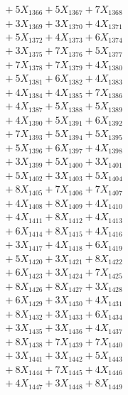 \documentclass[a4paper,10pt]{article}
\begin{document}
{\begin{align}
&\;  + 5 X_{1366} + 5 X_{1367} + 7 X_{1368} \\[0.3ex]
&\;  + 3 X_{1369} + 3 X_{1370} + 4 X_{1371} \\[0.3ex]
&\;  + 5 X_{1372} + 4 X_{1373} + 6 X_{1374} \\[0.3ex]
&\;  + 3 X_{1375} + 7 X_{1376} + 5 X_{1377} \\[0.3ex]
&\;  + 7 X_{1378} + 7 X_{1379} + 4 X_{1380} \\[0.3ex]
&\;  + 5 X_{1381} + 6 X_{1382} + 4 X_{1383} \\[0.3ex]
&\;  + 4 X_{1384} + 4 X_{1385} + 7 X_{1386} \\[0.3ex]
&\;  + 4 X_{1387} + 5 X_{1388} + 5 X_{1389} \\[0.5ex]\allowbreak
&\;  + 4 X_{1390} + 5 X_{1391} + 6 X_{1392} \\[0.3ex]
&\;  + 7 X_{1393} + 5 X_{1394} + 5 X_{1395} \\[0.3ex]
&\;  + 5 X_{1396} + 6 X_{1397} + 4 X_{1398} \\[0.3ex]
&\;  + 3 X_{1399} + 5 X_{1400} + 3 X_{1401} \\[0.3ex]
&\;  + 5 X_{1402} + 3 X_{1403} + 5 X_{1404} \\[0.3ex]
&\;  + 8 X_{1405} + 7 X_{1406} + 7 X_{1407} \\[0.3ex]
&\;  + 4 X_{1408} + 8 X_{1409} + 4 X_{1410} \\[0.3ex]
&\;  + 4 X_{1411} + 8 X_{1412} + 4 X_{1413} \\[0.3ex]
&\;  + 6 X_{1414} + 8 X_{1415} + 4 X_{1416} \\[0.3ex]
&\;  + 3 X_{1417} + 4 X_{1418} + 6 X_{1419} \\[0.5ex]\allowbreak
&\;  + 5 X_{1420} + 3 X_{1421} + 8 X_{1422} \\[0.3ex]
&\;  + 6 X_{1423} + 3 X_{1424} + 7 X_{1425} \\[0.3ex]
&\;  + 8 X_{1426} + 8 X_{1427} + 3 X_{1428} \\[0.3ex]
&\;  + 6 X_{1429} + 3 X_{1430} + 4 X_{1431} \\[0.3ex]
&\;  + 8 X_{1432} + 3 X_{1433} + 6 X_{1434} \\[0.3ex]
&\;  + 3 X_{1435} + 3 X_{1436} + 4 X_{1437} \\[0.3ex]
&\;  + 8 X_{1438} + 7 X_{1439} + 7 X_{1440} \\[0.3ex]
&\;  + 3 X_{1441} + 3 X_{1442} + 5 X_{1443} \\[0.3ex]
&\;  + 8 X_{1444} + 7 X_{1445} + 4 X_{1446} \\[0.3ex]
&\;  + 4 X_{1447} + 3 X_{1448} + 8 X_{1449} \\[0.5ex]\allowbreak

\end{align}}
\end{document}
